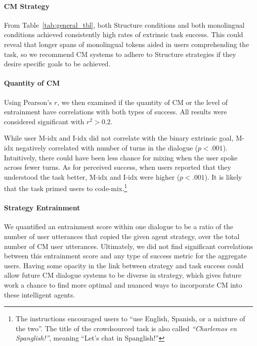 \documentclass[11pt,a4paper]{article}
\newcommand{\tref}[1]{Table~\ref{#1}}
\begin{document}
\paragraph{CM Strategy}
From \tref{tab:general_tbl}, both Structure conditions and both monolingual conditions achieved consistently high rates of extrinsic task success.
This could reveal that longer spans of monolingual tokens aided in users comprehending the task, so we recommend CM systems to adhere to Structure strategies if they desire specific goals to be achieved.

\paragraph{Quantity of CM}
Using Pearson's $r$, we then examined if the quantity of CM or the level of entrainment have correlations with both types of success.
All results were considered significant with $r^2 > 0.2$.

While user M-idx and I-idx did not correlate with the binary extrinsic goal, M-idx negatively correlated with number of turns in the dialogue ($p < .001$).
Intuitively, there could have been less chance for mixing when the user spoke across fewer turns.
As for perceived success, when users reported that they understood the task better, M-idx and I-idx were higher ($p < .001$).
It is likely that the task primed users to code-mix.\footnote{The instructions encouraged users to ``use English, Spanish, or a mixture of the two''. The title of the crowdsourced task is also called \textit{``Charlemos en Spanglish!''}, meaning ``Let's chat in Spanglish!''}

\paragraph{Strategy Entrainment}
We quantified an entrainment score within one dialogue to be a ratio of the number of user utterances that copied the given agent strategy, over the total number of CM user utterances. 
Ultimately, we did not find significant correlations between this entrainment score and any type of success metric for the aggregate users.
Having some opacity in the link between strategy and task success could allow future CM dialogue systems to be diverse in strategy, which gives future work a chance to find more optimal and nuanced ways to incorporate CM into these intelligent agents.
\end{document}
